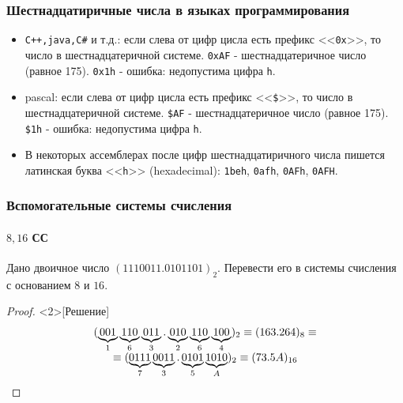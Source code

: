 \begin{frame}[fragile]
    \frametitle{Шестнадцатиричные числа в языках программирования}
    
    \begin{itemize}
        \item \verb"С++,java,C#" и т.д.: если слева от цифр цисла есть префикс <<\verb"0x">>, то число в шестнадцатеричной системе. \verb"0xAF" - шестнадцатеричное число (равное 175). \verb"0x1h" - ошибка: недопустима цифра \verb"h".
        
        \item pascal: если слева от цифр цисла есть префикс <<\verb"$">>, то число в шестнадцатеричной системе. \verb"$AF" - шестнадцатеричное число (равное 175). \verb"$1h" - ошибка: недопустима цифра \verb"h".
        
        \item В некоторых ассемблерах после цифр шестнадцатиричного числа пишется латинская буква <<\verb"h">> (hexadecimal): \verb"1beh", \verb"0afh", \verb"0AFh", \verb"0AFH".
    \end{itemize}
\end{frame}

\begin{frame}
    \frametitle{Вспомогательные системы счисления}
    \framesubtitle{$8,16$ СС}

    \begin{example}[Задача]
        Дано двоичное число $(1110011.0101101)_2$. Перевести его в системы счисления с основанием $8$ и $16$.
    \end{example}
    \begin{proof}<2>[Решение]
        \[
            \begin{array}[c]{c}
                (
                \underbrace{001}_{1}
                \underbrace{110}_{6}
                \underbrace{011}_{3}.
                \underbrace{010}_{2}
                \underbrace{110}_{6}
                \underbrace{100}_{4})_2\equiv(163.264)_8\equiv\\
                \equiv(
                \underbrace{0111}_{7}
                \underbrace{0011}_{3}.
                \underbrace{0101}_{5}
                \underbrace{1010}_{A}
                )_2\equiv(73.5A)_{16}
            \end{array}
        \]
    \end{proof}
\end{frame}

